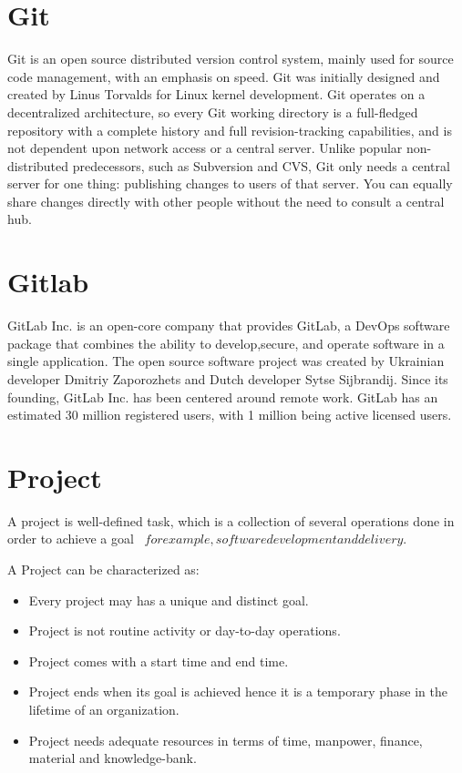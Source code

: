     \section{Git}
    Git is an open source distributed version control system, mainly used for source code management, with
    an emphasis on speed. Git was initially designed and created by Linus Torvalds for Linux kernel development.
    Git operates on a decentralized architecture, so every Git working directory is a full-fledged repository
    with a complete history and full revision-tracking capabilities, and is not dependent upon network access or 
    a central server. Unlike popular non-distributed predecessors, such as Subversion and CVS, Git only needs a 
    central server for one thing: publishing changes to users of that server. You can equally share changes 
    directly with other people without the need to consult a central hub.

    \section{Gitlab}
    GitLab Inc. is an open-core company that provides GitLab, a DevOps software package that combines the
    ability to develop,secure, and operate software in a single application. The open source software project
    was created by Ukrainian developer Dmitriy Zaporozhets and Dutch developer Sytse Sijbrandij. Since its
    founding, GitLab Inc. has been centered around remote work. GitLab has an estimated 30 million registered 
    users, with 1 million being active licensed users.

    \section{Project}
    A project is well-defined task, which is a collection of several operations done in order to achieve a goal 
     \(for example, software development and delivery\).
     \medskip
    
    A Project can be characterized as:
    \begin{itemize}
        \item Every project may has a unique and distinct goal.
        \item Project is not routine activity or day-to-day operations.
        \item Project comes with a start time and end time.
        \item Project ends when its goal is achieved hence it is a temporary phase in the lifetime of an organization.
        \item Project needs adequate resources in terms of time, manpower, finance, material and knowledge-bank.
    \end{itemize}

